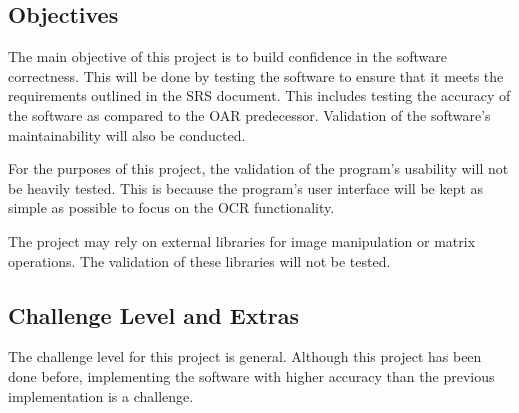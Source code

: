\documentclass[12pt, titlepage]{article}
\begin{document}
\subsection{Objectives}

The main objective of this project is to build confidence in the software
correctness. This will be done by testing the software to ensure that it meets
the requirements outlined in the SRS document. This includes testing the accuracy
of the software as compared to the OAR predecessor. Validation of the software's
maintainability will also be conducted.

For the purposes of this project, the validation of the program's usability
will not be heavily tested. This is because the program's user interface will be
kept as simple as possible to focus on the OCR functionality.

The project may rely on external libraries for image manipulation or matrix
operations. The validation of these libraries will not be tested.




\subsection{Challenge Level and Extras}

The challenge level for this project is general. Although this project has been
done before, implementing the software with higher accuracy than the previous
implementation is a challenge.
\end{document}
